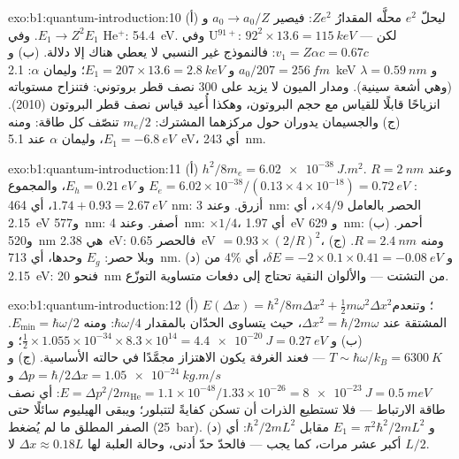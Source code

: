 \begin{solution}{exo:b1:quantum-introduction:10}
(أ) ليحلّ $e^2$ محلَّه المقدارُ $Ze^2$: فيصير $a_0 \to a_0/Z$ و $E_1 \to Z^2E_1$. وفي He$^+$:
\qty{54.4}{eV}. وفي U$^{91+}$: $92^2 \times 13.6 = \qty{115}{keV}$ --- لكن $v_1 = Z\alpha c
= 0.67c$: فالنموذج غير النسبي لا يعطي هناك إلا دلالة. (ب) و $a_0/207
= \qty{256}{fm}$ و $E_1 = 207 \times 13.6 = \qty{2.8}{keV}$؛ وليمان $\alpha$:
\qty{2.1}{keV} و $\lambda = \qty{0.59}{nm}$ (وهي أشعة سينية). ومدار الميون لا يزيد على
$300$ نصف قطر بروتوني: فتنزاح مستوياته انزياحًا قابلًا للقياس مع حجم البروتون،
وهكذا أُعيد قياس نصف قطر البروتون (2010). (ج) والجسيمان
يدوران حول مركزهما المشترك:  $m_e/2$ تنصّف
كل طاقة: ومنه $E_1 = \qty{-6.8}{eV}$، وليمان $\alpha$ عند \qty{5.1}{eV}، أي \qty{243}{nm}.
\end{solution}

\begin{solution}{exo:b1:quantum-introduction:11}
(أ) $h^2/8m_e = \qty{6.02e-38}{J.m^2}$. وعند $R = \qty{2}{nm}$: $E_e = 6.02 \times 10^{-38}/
(0.13 \times 4 \times 10^{-18}) = \qty{0.72}{eV}$ و $E_h = \qty{0.21}{eV}$، والمجموع $1.74 +
0.93 = \qty{2.67}{eV}$، أي \qty{464}{nm}: أزرق. وعند \qty{3}{nm}: الحصر بالعامل $\times4/9$،
أي \qty{2.15}{eV} و\qty{577}{nm}: أصفر. وعند \qty{4}{nm}: $\times1/4$، أي \qty{1.97}{eV} و
\qty{629}{nm}: أحمر. (ب) و\qty{520}{nm} هي \qty{2.38}{eV}: فالحصر \qty{0.65}{eV}
$= 0.93 \times (2/R)^2$، ومنه $R = \qty{2.4}{nm}$. (ج) وبلا حصر: $E_g$ وحدها،
أي \qty{713}{nm}. (د) و $\delta E = -2 \times 0.1 \times 0.41 = \qty{-0.08}{eV}$، أي $4\%$ من
\qty{2.15}{eV}: فنحو \qty{20}{nm} من التشتت --- والألوان النقية تحتاج إلى
دفعات متساوية التوزّع.
\end{solution}

\begin{solution}{exo:b1:quantum-introduction:12}
(أ) $E(\Delta x) = \hbar^2/8m\Delta x^2 + \tfrac12m\omega^2\Delta x^2$؛ وتنعدم المشتقة عند
$\Delta x^2 = \hbar/2m\omega$، حيث يتساوى الحدّان بالمقدار $\hbar\omega/4$: ومنه $E_{\min} =
\hbar\omega/2$. (ب) و $\tfrac12 \times 1.055 \times 10^{-34} \times 8.3 \times 10^{14} = \qty{4.4e-20}{J}
= \qty{0.27}{eV}$؛ و $T \sim \hbar\omega/k_B = \qty{6300}{K}$ --- فعند  الغرفة
يكون الاهتزاز مجمَّدًا في حالته الأساسية. (ج) و $\Delta p = \hbar/2\Delta x =
\qty{1.05e-24}{kg.m/s}$ و $E = \Delta p^2/2m_{\mathrm{He}} = 1.1 \times 10^{-48}/1.33 \times
10^{-26} = \qty{8e-23}{J} = \qty{0.5}{meV}$: أي نصف طاقة الارتباط --- فلا تستطيع الذرات
أن تسكن كفايةً لتتبلور؛ ويبقى الهيليوم سائلًا حتى الصفر
المطلق ما لم يُضغط (\qty{25}{bar}). (د) و $E_1 = \pi^2\hbar^2/2mL^2$ مقابل
$\hbar^2/2mL^2$: أي أكبر عشر مرات، كما يجب --- فالحدّ حدّ أدنى،
وحالة العلبة لها $\Delta x \approx 0.18L$ لا $L/2$.
\end{solution}

